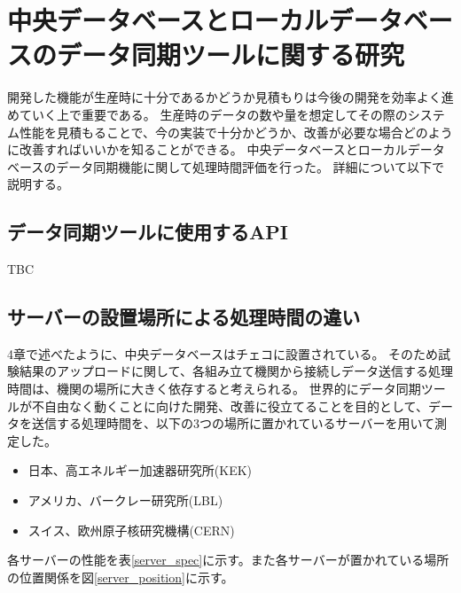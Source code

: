 \chapter{中央データベースとローカルデータベースのデータ同期ツールに関する研究}

開発した機能が生産時に十分であるかどうか見積もりは今後の開発を効率よく進めていく上で重要である。
生産時のデータの数や量を想定してその際のシステム性能を見積もることで、今の実装で十分かどうか、改善が必要な場合どのように改善すればいいかを知ることができる。
中央データベースとローカルデータベースのデータ同期機能に関して処理時間評価を行った。
詳細について以下で説明する。

\section{データ同期ツールに使用するAPI}
TBC

\section{サーバーの設置場所による処理時間の違い}
4章で述べたように、中央データベースはチェコに設置されている。
そのため試験結果のアップロードに関して、各組み立て機関から接続しデータ送信する処理時間は、機関の場所に大きく依存すると考えられる。
世界的にデータ同期ツールが不自由なく動くことに向けた開発、改善に役立てることを目的として、データを送信する処理時間を、以下の3つの場所に置かれているサーバーを用いて測定した。

\begin{itemize}
  \item 日本、高エネルギー加速器研究所(KEK) 
  \item アメリカ、バークレー研究所(LBL)
  \item スイス、欧州原子核研究機構(CERN)
\end{itemize}

各サーバーの性能を表\ref{server_spec}に示す。また各サーバーが置かれている場所の位置関係を図\ref{server_position}に示す。

\begin{table}[tbp]
\caption[サーバーの性能一覧]{サーバーの性能一覧}
\label{server_spec}
\end{table}


